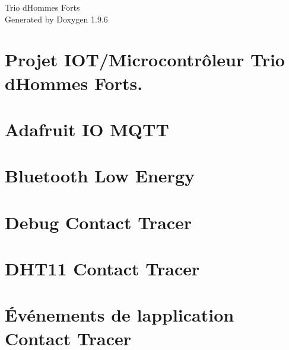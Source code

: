 \documentclass[twoside]{book}
\newcommand{\+}{\discretionary{\mbox{\scriptsize$\hookleftarrow$}}{}{}}
\newcommand{\clearemptydoublepage}{%
    \newpage{\pagestyle{empty}\cleardoublepage}%
  }
\begin{document}
  \raggedbottom
    \hypersetup{pageanchor=false,
                bookmarksnumbered=true,
                pdfencoding=unicode
               }
  \begin{titlepage}
  \vspace*{7cm}
  \begin{center}%
  {\Large Trio d\textquotesingle{}\+Hommes Forts}\\
  \vspace*{1cm}
  {\large Generated by Doxygen 1.9.6}\\
  \end{center}
  \end{titlepage}
  \clearemptydoublepage
  \tableofcontents
  \clearemptydoublepage
  \hypersetup{pageanchor=true}
\chapter{Projet IOT/\+Microcontrôleur Trio d\textquotesingle{}Hommes Forts.}
\label{index}\hypertarget{index}{}
\chapter{Adafruit IO MQTT}
\label{_adafruit_i_o}

\chapter{Bluetooth Low Energy}
\label{_c_t_b_l_e}

\chapter{Debug Contact Tracer}
\label{_c_t_debug}

\chapter{DHT11 Contact Tracer}
\label{_c_t_d_h_t}

\chapter{Événements de l\textquotesingle{}application Contact Tracer}
\label{_c_t_events}

\end{document}
